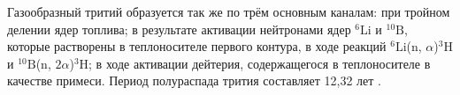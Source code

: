 Газообразный тритий образуется так же по трём основным каналам: при тройном делении ядер топлива; в результате активации 
нейтронами ядер $^{6}\text{Li}$ и $^{10}\text{B}$, которые растворены в теплоносителе первого контура, в ходе реакций 
$^{6}\text{Li}$(n, $\alpha$)$^{3}\text{H}$ и $^{10}\text{B}$(n, $2\alpha$)$^{3}\text{H}$; в ходе активации дейтерия, 
содержащегося в теплоносителе в качестве примеси. Период полураспада трития составляет 12,32 лет \cite{bekman_nuclear}.





